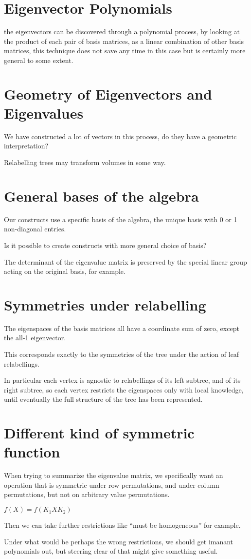 \documentclass[10pt,a4paper]{report}
\begin{document}
\section{Eigenvector Polynomials}

the eigenvectors can be discovered through a polynomial process, by looking at
the product of each pair of basis matrices, as a linear combination of other
basis matrices, this technique does not save any time in this case but is
certainly more general to some extent.

\section{Geometry of Eigenvectors and Eigenvalues}

We have constructed a lot of vectors in this process, do they have a geometric
interpretation?

Relabelling trees may transform volumes in some way.

\section{General bases of the algebra}

Our constructs use a specific basis of the algebra, the unique basis with 0 or
1 non-diagonal entries.

Is it possible to create constructs with more general choice of basis?

The determinant of the eigenvalue matrix is preserved by the special linear
group acting on the original basis, for example.

\section{Symmetries under relabelling}

The eigenspaces of the basis matrices all have a coordinate sum of zero, except
the all-1 eigenvector.

This corresponds exactly to the symmetries of the tree under the action of leaf
relabellings.

In particular each vertex is agnostic to relabellings of its left subtree, and
of its right subtree, so each vertex restricts the eigenspaces only with local
knowledge, until eventually the full structure of the tree has been
represented.

\section{Different kind of symmetric function}

When trying to summarize the eigenvalue matrix, we specifically want an
operation that is symmetric under row permutations, and under column
permutations, but not on arbitrary value permutations.

$f(X) = f(K_1XK_2)$

Then we can take further restrictions like ``must be homogeneous'' for example.

Under what would be perhaps the wrong restrictions, we should get imanant
polynomials out, but steering clear of that might give something useful.
\end{document}
